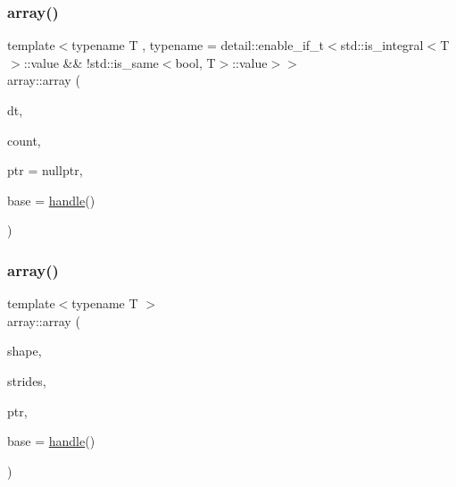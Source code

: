 \subsubsection{\texorpdfstring{array()}{array()}\hspace{0.1cm}{\footnotesize\ttfamily [4/8]}}
{\footnotesize\ttfamily template$<$typename T , typename  = detail\+::enable\+\_\+if\+\_\+t$<$std\+::is\+\_\+integral$<$\+T$>$\+::value \&\& !std\+::is\+\_\+same$<$bool, T$>$\+::value$>$$>$ \\
array\+::array (\begin{DoxyParamCaption}\item[{const pybind11\+::dtype \&}]{dt,  }\item[{T}]{count,  }\item[{const \mbox{\hyperlink{_s_d_l__opengles2__gl2ext_8h_ae5d8fa23ad07c48bb609509eae494c95}{void}} $\ast$}]{ptr = {\ttfamily nullptr},  }\item[{\mbox{\hyperlink{classhandle}{handle}}}]{base = {\ttfamily \mbox{\hyperlink{classhandle}{handle}}()} }\end{DoxyParamCaption})\hspace{0.3cm}{\ttfamily [inline]}}

\mbox{\label{classarray_af12d5d4757512f405a734ab2fe235f26}} 
\subsubsection{\texorpdfstring{array()}{array()}\hspace{0.1cm}{\footnotesize\ttfamily [5/8]}}
{\footnotesize\ttfamily template$<$typename T $>$ \\
array\+::array (\begin{DoxyParamCaption}\item[{\mbox{\hyperlink{classarray_a3378d7821106645fa3a88c5222e127e0}{Shape\+Container}}}]{shape,  }\item[{\mbox{\hyperlink{classarray_a8ba4f30946f0bc69ec937160c9fb10e1}{Strides\+Container}}}]{strides,  }\item[{const T $\ast$}]{ptr,  }\item[{\mbox{\hyperlink{classhandle}{handle}}}]{base = {\ttfamily \mbox{\hyperlink{classhandle}{handle}}()} }\end{DoxyParamCaption})\hspace{0.3cm}{\ttfamily [inline]}}

\mbox{\label{classarray_a29a0ed58b37adec393508a4eeed4236f}} 
